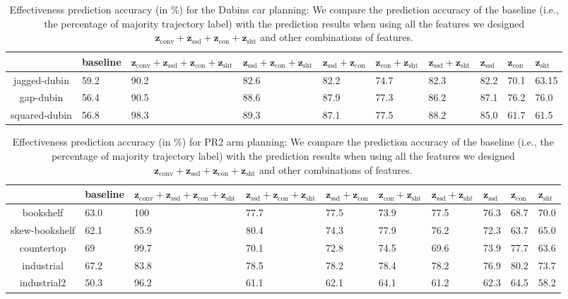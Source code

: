 \documentclass[letterpaper, 10 pt, conference]{ieeeconf}  %
\newcommand{\fssd}{\mbox{$\mathbf z_{\text{ssd}}$}}
\newcommand{\fcon}{\mbox{$\mathbf z_{\text{con}}$}}
\newcommand{\fsht}{\mbox{$\mathbf z_{\text{sht}}$}}
\newcommand{\fconv}{\mbox{$\mathbf z_{\text{conv}}$}}
\begin{document}
\begin{table}[tbp]
\centering
\begin{tabular}{|c|R{0.9cm}|R{1.5cm}|R{1.3cm}|R{1.2cm}|R{1.2cm}|R{1.2cm}|R{0.9cm}|R{0.9cm}|R{0.9cm}|}
\hline 
 & baseline & $\fconv +\fssd+\fcon+\fsht$  & $\fssd+\fcon+\fsht$ & $\fssd+\fcon$ & $\fcon+\fsht$ & $\fssd+\fsht$ & $\fssd$ & $\fcon$ & $\fsht$ \\ \hline \hline
jagged-dubin & 59.2 & 90.2  & 82.6	& 82.2 & 74.7 & 82.3 & 82.2 & 70.1 & 63.15 \\ \hline
gap-dubin & 56.4 & 90.5 & 88.6 & 87.9 & 77.3 & 86.2 & 87.1 & 76.2 & 76.0 \\ \hline
squared-dubin & 56.8 & 98.3 & 89.3 & 	87.1 & 	77.5 &	88.2 &	85.0 &	 61.7	& 61.5 \\ \hline
\end{tabular}
\caption{Effectiveness prediction accuracy (in \%) for the Dubins car planning: We compare the prediction accuracy of the baseline (i.e., the percentage of majority trajectory label) with the prediction results when using all the features we designed $\fconv+\fssd+\fcon+\fsht$ and other combinations of features.}
\label{tab:result-dubins}
\end{table}


\begin{table}[tbp]
\centering
\begin{tabular}{|c|R{0.9cm}|R{1.5cm}|R{1.3cm}|R{1.2cm}|R{1.2cm}|R{1.2cm}|R{0.9cm}|R{0.9cm}|R{0.9cm}|}
\hline 
 & baseline & $\fconv +\fssd+\fcon+\fsht$  & $\fssd+\fcon+\fsht$ & $\fssd+\fcon$ & $\fcon+\fsht$ & $\fssd+\fsht$ & $\fssd$ & $\fcon$ & $\fsht$ \\ \hline \hline
bookshelf & 63.0 & 100 & 77.7 & 	77.5 &	73.9 &	77.5 &	76.3 &	68.7 & 70.0 \\ \hline
skew-bookshelf & 62.1 & 85.9 & 80.4 &	74.3 & 	77.9 & 	76.2 &	72.3 &	63.7 &	65.0 \\ \hline
countertop & 69 & 99.7 & 70.1	& 72.8 & 	74.5	 & 69.6 & 	73.9 &	77.7 &	63.6 \\ \hline
industrial & 67.2 & 83.8 & 78.5 &	78.2 &	78.4 &	78.2 &	76.9 &	80.2 & 	73.7 \\ \hline
industrial2 & 50.3 & 96.2 & 61.1 & 	62.1	 & 64.1 &	61.2 & 	62.3 & 	64.5 &	58.2 \\ \hline
\end{tabular}
\caption{Effectiveness prediction accuracy (in \%) for PR2 arm planning: We compare the prediction accuracy of the baseline (i.e., the percentage of majority trajectory label) with the prediction results when using all the features we designed $\fconv+\fssd+\fcon+\fsht$ and other combinations of features.}
\label{tab:result-arm}
\end{table}
\end{document}
